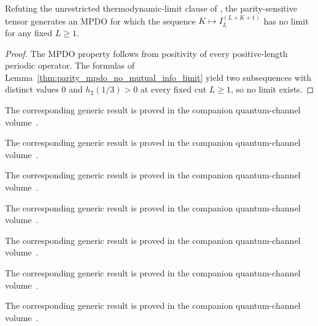 \begin{lemma}
    \label{thm:cpsv_prop45_limit_counterexample}
    \leanok
    Refuting the unrestricted thermodynamic-limit clause of
    \cite[Proposition~4.5]{Cirac2016MPDO_arXiv}, the parity-sensitive tensor
    generates an MPDO for which the sequence $K\mapsto I_L^{(L+K+1)}$ has no
    limit for any fixed $L\geq1$.
\end{lemma}

\begin{proof}\leanok
    The MPDO property follows from positivity of every positive-length
    periodic operator. The formulas of
    Lemma~\ref{thm:parity_mpdo_no_mutual_info_limit} yield two subsequences
    with distinct values $0$ and $h_2(1/3)>0$ at every fixed cut $L\ge 1$, so no
    limit exists.
\end{proof}


The corresponding generic result is proved in the companion quantum-channel volume~\cite[``Map on the second tensor factor'']{QICLean2026Blueprint}.



The corresponding generic result is proved in the companion quantum-channel volume~\cite[``Independent maps on both tensor factors'']{QICLean2026Blueprint}.



The corresponding generic result is proved in the companion quantum-channel volume~\cite[``Positivity under a map on the first tensor factor'']{QICLean2026Blueprint}.



The corresponding generic result is proved in the companion quantum-channel volume~\cite[``Positivity under a map on the second tensor factor'']{QICLean2026Blueprint}.



The corresponding generic result is proved in the companion quantum-channel volume~\cite[``Positivity under independent maps'']{QICLean2026Blueprint}.



The corresponding generic result is proved in the companion quantum-channel volume~\cite[``Data processing on the first tensor factor'']{QICLean2026Blueprint}.



The corresponding generic result is proved in the companion quantum-channel volume~\cite[``Data processing on the second tensor factor'']{QICLean2026Blueprint}.



